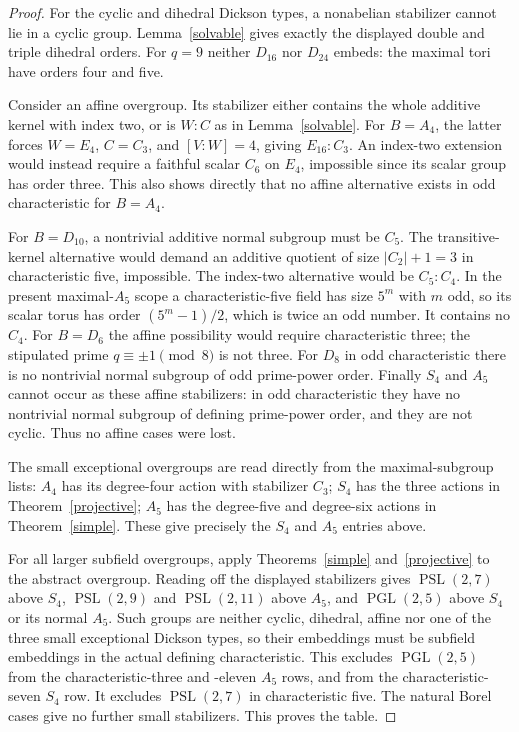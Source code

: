 \documentclass[11pt]{article}
\newcommand{\PSL}{\operatorname{PSL}}
\newcommand{\PGL}{\operatorname{PGL}}
\begin{document}
\begin{proof}
For the cyclic and dihedral Dickson types, a nonabelian
stabilizer cannot lie in a cyclic group. Lemma~\ref{solvable}
gives exactly the displayed double and triple dihedral orders.
For $q=9$ neither $D_{16}$ nor $D_{24}$ embeds: the maximal
tori have orders four and five.

Consider an affine overgroup. Its stabilizer either contains
the whole additive kernel with index two, or is $W:C$ as in
Lemma~\ref{solvable}. For $B=A_4$, the latter forces
$W=E_4$, $C=C_3$, and $[V:W]=4$, giving $E_{16}:C_3$.
An index-two extension would instead require a faithful scalar
$C_6$ on $E_4$, impossible since its scalar group has order
three. This also shows directly that no affine alternative
exists in odd characteristic for $B=A_4$.

For $B=D_{10}$, a nontrivial additive normal subgroup must be
$C_5$. The transitive-kernel alternative would demand an additive
quotient of size $|C_2|+1=3$ in characteristic five, impossible.
The index-two alternative would be $C_5:C_4$. In the present
maximal-$A_5$ scope a characteristic-five field has size $5^m$
with $m$ odd, so its scalar torus has order $(5^m-1)/2$, which
is twice an odd number. It contains no $C_4$. For $B=D_6$
the affine possibility would require characteristic three;
the stipulated prime $q\equiv\pm1\pmod8$ is not three.
For $D_8$ in odd characteristic there is no nontrivial normal
subgroup of odd prime-power order. Finally $S_4$ and $A_5$
cannot occur as these affine stabilizers: in odd characteristic
they have no nontrivial normal subgroup of defining prime-power
order, and they are not cyclic. Thus no affine cases were lost.

The small exceptional overgroups are read directly from the
maximal-subgroup lists: $A_4$ has its degree-four action with
stabilizer $C_3$; $S_4$ has the three actions in
Theorem~\ref{projective}; $A_5$ has the degree-five and degree-six
actions in Theorem~\ref{simple}. These give precisely the
$S_4$ and $A_5$ entries above.

For all larger subfield overgroups, apply Theorems~\ref{simple}
and~\ref{projective} to the abstract overgroup. Reading off
the displayed stabilizers gives $\PSL(2,7)$ above $S_4$,
$\PSL(2,9)$ and $\PSL(2,11)$ above $A_5$, and
$\PGL(2,5)$ above $S_4$ or its normal $A_5$. Such groups
are neither cyclic, dihedral, affine nor one of the three small
exceptional Dickson types, so their embeddings must be subfield
embeddings in the actual defining characteristic. This excludes
$\PGL(2,5)$ from the characteristic-three and -eleven $A_5$
rows, and from the characteristic-seven $S_4$ row. It excludes
$\PSL(2,7)$ in characteristic five. The natural Borel cases
give no further small stabilizers. This proves the table.
\end{proof}
\end{document}

